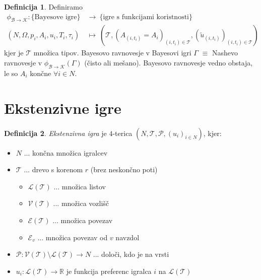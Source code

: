 \documentclass[11pt]{article}
\newcommand{\R}{\mathbb{R}}
\newcommand{\set}[1]{\{#1\}}
\renewcommand{\P}{\mathcal{P}}
\newcommand{\TT}{\mathcal{T}}
\newcommand{\V}{\mathscr{V}}
\renewcommand{\L}{\mathscr{L}}
\newcommand{\1}{\mathbbm{1}}
\newcommand{\bay}{\mathscr{B}}
\newcommand{\kor}{\mathscr{K}}
\theoremstyle{definition}
\newtheorem{definicija}{Definicija}[section]
\theoremstyle{definition}
\theoremstyle{definition}
\theoremstyle{definition}
\begin{document}
\begin{definicija}

Definiramo
\begin{align*}
\phi_{\bay\rightarrow\kor}: \set{\text{Bayesove igre}} ~&\rightarrow~ \set{\text{igre s funkcijami koristnosti}} \\
(N,\Omega,p_i,A_i,u_i,T_i,\tau_i) ~&\mapsto~ (\mathcal{T}, (A_{(i,t_i)}=A_i)_{(i,t_i)\in\mathcal{T}}, (\tilde{u}_{(i,t_i)})_{(i,t_i)\in\mathcal{T}})
\end{align*}
kjer je $\mathcal{T}$ množica tipov. Bayesovo ravnovesje v Bayesovi igri $\Gamma$ $\equiv$ Nashevo ravnovesje v $\phi_{\bay\rightarrow\kor}(\Gamma)$ (čisto ali mešano). Bayesovo ravnovesje vedno obstaja, le so $A_i$ končne $\forall i \in N$.

\end{definicija}
\vspace{0.5cm}


\pagebreak


\section{Ekstenzivne igre}
\vspace{0.5cm}

\begin{definicija}

\textit{Ekstenzivna igra} je $4$-terica $(N, \TT, \P, (u_i)_{i \in N})$, kjer:
\begin{itemize}
	\item $N$ ... končna množica igralcev
	\item $\TT$ ... drevo s korenom $r$ (brez neskončno poti)
	\begin{itemize}
		\item $\mathscr{L}(\TT)$ ... množica listov
		\item $\mathscr{V}(\TT)$ ... množica vozlišč
		\item $\mathscr{E}(\TT)$ ... množica povezav
		\item $\mathscr{E}_v$ ... množica povezav od $v$ navzdol
	\end{itemize}
	\item $\P: \V(\TT)\setminus\L(\TT) \rightarrow N$ ... določi, kdo je na vrsti
	\item $u_i: \L(\TT) \rightarrow \R$ je funkcija preferenc igralca $i$ na $\L(\TT)$
\end{itemize}

\end{definicija}
\vspace{0.5cm}
\end{document}
